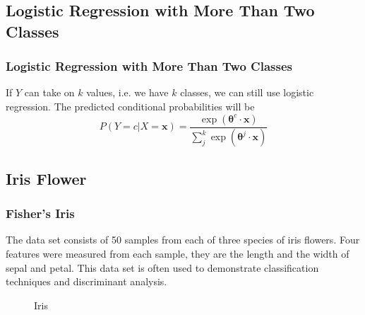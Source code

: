\documentclass{beamer}
\begin{document}
\subsection{Logistic Regression with More Than Two Classes}
\begin{frame}
\frametitle{Logistic Regression with More Than Two Classes}
If $Y$ can take on $k$ values, i.e. we have $k$ classes, we can still use logistic regression. The predicted conditional probabilities will be 
\begin{equation}
P(Y = c | X = \mathbf{x}) = \frac{\exp ({\bm{\theta}^{c} \cdot \mathbf{x} })}{ \sum_{j}^{k} \exp(\bm{\theta}^{j} \cdot \mathbf{x}) }
\end{equation}
\end{frame}

\subsection{Iris Flower}
\begin{frame}
\frametitle{Fisher's Iris}
The data set consists of 50 samples from each of three 
species of iris flowers.  Four features were measured from each
sample, they are the length and the width of sepal and petal. This data set is often used
to demonstrate classification techniques and discriminant analysis.

\begin{figure}[htbp] \centering {}
\hspace{20pt} 
\hspace{20pt} 
\caption{Iris } \end{figure}
\end{frame}
\end{document}
